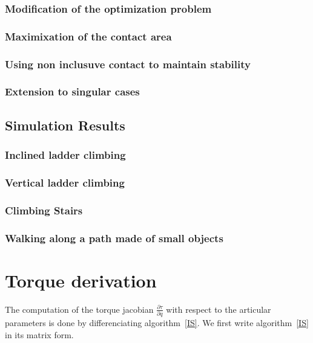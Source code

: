 \subsubsection{Modification of the optimization problem}
\subsubsection{Maximixation of the contact area}
\subsubsection{Using non inclusuve contact to maintain stability}
\subsubsection{Extension to singular cases}
\subsection{Simulation Results}
\subsubsection{Inclined ladder climbing}
\subsubsection{Vertical ladder climbing}
\subsubsection{Climbing Stairs}
\subsubsection{Walking along a path made of small objects}



\section{Torque derivation}
\label{sec:torque_derivation}


The computation of the torque jacobian $\frac{\partial \tau}{\partial q}$ with respect to the articular parameters is done by differenciating algorithm~\ref{IS}.
We first write algorithm~\ref{IS} in its matrix form.

